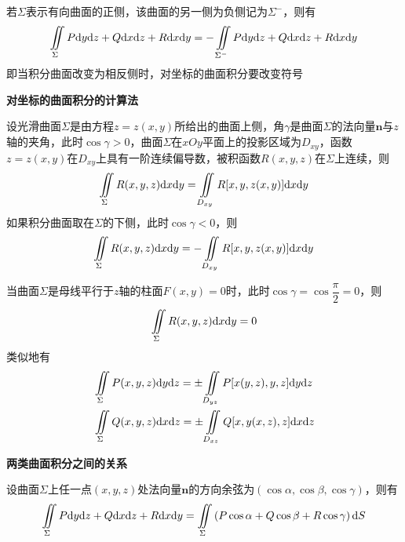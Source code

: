 \begin{property}
    若$\Sigma$表示有向曲面的正侧，该曲面的另一侧为负侧记为$\Sigma^{-}$，则有
    \begin{equation*}
        \iint \limits_{\Sigma}P\mathrm{d} y\mathrm{d} z+Q\mathrm{d} x\mathrm{d} z+R\mathrm{d} x\mathrm{d} y=-\iint \limits_{\Sigma^{-}}P\mathrm{d} y\mathrm{d} z+Q\mathrm{d} x\mathrm{d} z+R\mathrm{d} x\mathrm{d} y
    \end{equation*}
    即当积分曲面改变为相反侧时，对坐标的曲面积分要改变符号
\end{property}

\textbf{对坐标的曲面积分的计算法}

设光滑曲面$\Sigma$是由方程$z=z(x,y)$所给出的曲面上侧，角$\gamma$是曲面$\Sigma$的法向量$\bm{n}$与$z$轴的夹角，此时$\cos\gamma>0$，曲面$\Sigma$在$xOy$平面上的投影区域为$D_{xy}$，函数$z=z(x,y)$在$D_{xy}$上具有一阶连续偏导数，被积函数$R(x,y,z)$在$\Sigma$上连续，则
\begin{equation*}
    \iint \limits_{\Sigma}R(x,y,z)\mathrm{d} x\mathrm{d} y=\iint \limits_{D_{xy}}R[x,y,z(x,y)]\mathrm{d} x\mathrm{d} y
\end{equation*}
如果积分曲面取在$\Sigma$的下侧，此时$\cos\gamma<0$，则
\begin{equation*}
    \iint \limits_{\Sigma}R(x,y,z)\mathrm{d} x\mathrm{d} y=-\iint \limits_{D_{xy}}R[x,y,z(x,y)]\mathrm{d} x\mathrm{d} y
\end{equation*}

当曲面$\Sigma$是母线平行于$z$轴的柱面$F(x,y)=0$时，此时$\cos\gamma=\cos\dfrac{\pi}{2}=0$，则
\begin{equation*}
    \iint \limits_{\Sigma}R(x,y,z)\mathrm{d} x\mathrm{d} y=0
\end{equation*}
类似地有
\begin{align*}
    & \iint \limits_{\Sigma}P(x,y,z)\mathrm{d} y\mathrm{d} z=\pm\iint \limits_{D_{yz}}P[x(y,z),y,z]\mathrm{d} y\mathrm{d} z\\
    & \iint \limits_{\Sigma}Q(x,y,z)\mathrm{d} x\mathrm{d} z=\pm\iint \limits_{D_{xz}}Q[x,y(x,z),z]\mathrm{d} x\mathrm{d} z
\end{align*}

\textbf{两类曲面积分之间的关系}

设曲面$\Sigma$上任一点$(x,y,z)$处法向量$\bm{n}$的方向余弦为$(\cos\alpha,\cos\beta,\cos\gamma)$，则有
\begin{equation*}
    \iint \limits_{\Sigma}P\mathrm{d} y\mathrm{d} z+Q\mathrm{d} x\mathrm{d} z+R\mathrm{d} x\mathrm{d} y=\iint \limits_{\Sigma}\left(P\cos\alpha+Q\cos\beta+R\cos\gamma\right)\mathrm{d} S
\end{equation*}

